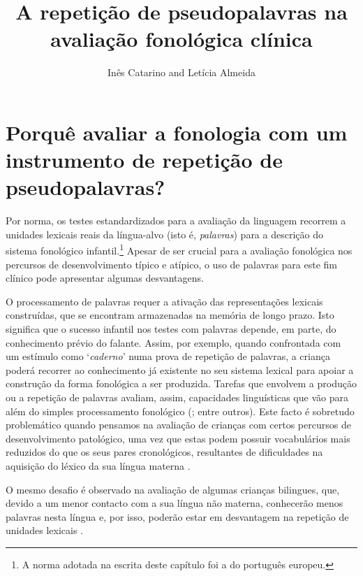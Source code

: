 \documentclass[output=paper,colorlinks,citecolor=brown,booklanguage=portuguese]{langscibook}
\title{A repetição de pseudopalavras na avaliação fonológica clínica}
\author{Inês Catarino\affiliation{Universidade de Lisboa,  Centro de Linguística} and  Letícia Almeida\affiliation{Universidade de Lisboa, Faculdade de Letras, Centro de Linguística}}
\begin{document}
\maketitle

\section{Porquê avaliar a fonologia com um instrumento de repetição de pseudopalavras?}\label{sec:cap9sec1}
Por norma, os testes estandardizados para a avaliação da linguagem recorrem a unidades lexicais reais da língua-alvo (isto é, \emph{palavras}) para a descrição do sistema fonológico infantil.\footnote{A norma adotada na escrita deste capítulo foi a do português europeu.}
Apesar de ser crucial para a avaliação fonológica nos percursos de desenvolvimento típico e atípico, o uso de palavras para este fim clínico pode apresentar algumas desvantagens.

O processamento de palavras requer a ativação das representações lexicais construídas, que se encontram armazenadas na memória de longo prazo. Isto significa que o sucesso infantil nos testes com palavras depende, em parte, do conhecimento prévio do falante. Assim, por exemplo, quando confrontada com um estímulo como ‘\emph{caderno}’ numa prova de repetição de palavras, a criança poderá recorrer ao conhecimento já existente no seu sistema lexical para apoiar a construção da forma fonológica a ser produzida. Tarefas que envolvem a produção ou a repetição de palavras avaliam, assim, capacidades linguísticas que vão para além do simples processamento fonológico (\citealp{Casalini2007, Dispaldro2013, Gathercole2006}; entre outros). Este facto é sobretudo problemático quando pensamos na avaliação de crianças com certos percursos de desenvolvimento patológico, uma vez que estas podem possuir vocabulários mais reduzidos do que os seus pares cronológicos, resultantes de dificuldades na aquisição do léxico da sua língua materna \citep{Edwards2004, Munson2005}.

O mesmo desafio é observado na avaliação de algumas crianças bilingues, que, devido a um menor contacto com a sua língua não materna, conhecerão menos palavras nesta língua e, por isso, poderão estar em desvantagem na repetição de unidades lexicais \citep{Chiat2015}.
\end{document}

